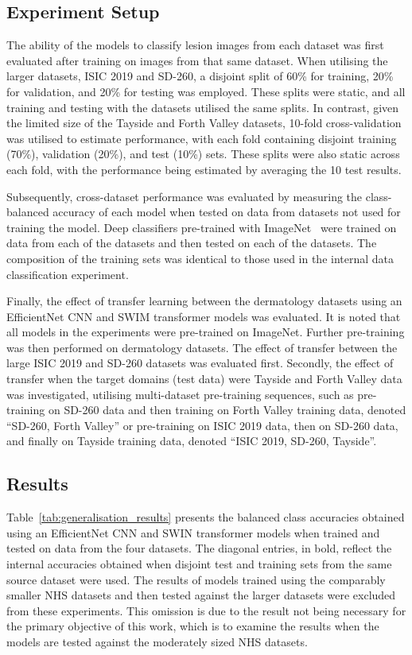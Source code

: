 \subsection{Experiment Setup}
\label{subsec:generalisation_experiment}
The ability of the models to classify lesion images from each dataset was first evaluated after training on images from that same dataset. When utilising the larger datasets, ISIC 2019 and SD-260, a disjoint split of 60\% for training, 20\% for validation, and 20\% for testing was employed. These splits were static, and all training and testing with the datasets utilised the same splits. In contrast, given the limited size of the Tayside and Forth Valley datasets, 10-fold cross-validation was utilised to estimate performance, with each fold containing disjoint training (70\%), validation (20\%), and test (10\%) sets. These splits were also static across each fold, with the performance being estimated by averaging the 10 test results.

Subsequently, cross-dataset performance was evaluated by measuring the class-balanced accuracy of each model when tested on data from datasets not used for training the model. Deep classifiers pre-trained with ImageNet~\citep{deng2009imagenet} were trained on data from each of the datasets and then tested on each of the datasets. The composition of the training sets was identical to those used in the internal data classification experiment.

Finally, the effect of transfer learning between the dermatology datasets using an EfficientNet CNN and SWIM transformer models was evaluated. It is noted that all models in the experiments were pre-trained on ImageNet. Further pre-training was then performed on dermatology datasets. The effect of transfer between the large ISIC 2019 and SD-260 datasets was evaluated first. Secondly, the effect of transfer when the target domains (test data) were Tayside and Forth Valley data was investigated, utilising multi-dataset pre-training sequences, such as pre-training on SD-260 data and then training on Forth Valley training data, denoted “SD-260, Forth Valley” or pre-training on ISIC 2019 data, then on SD-260 data, and finally on Tayside training data, denoted “ISIC 2019, SD-260, Tayside”.


\subsection{Results}
\label{subsec:generalisation_results}
Table~\ref{tab:generalisation_results} presents the balanced class accuracies obtained using an EfficientNet CNN and SWIN transformer models when trained and tested on data from the four datasets. The diagonal entries, in bold, reflect the internal accuracies obtained when disjoint test and training sets from the same source dataset were used. The results of models trained using the comparably smaller NHS datasets and then tested against the larger datasets were excluded from these experiments. This omission is due to the result not being necessary for the primary objective of this work, which is to examine the results when the models are tested against the moderately sized NHS datasets.

